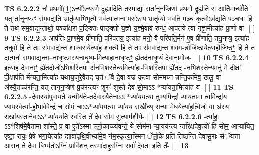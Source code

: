 \documentclass[17pt]{extarticle}
\begin{document}
                  \newline
                                \textbf{ TS 6.2.2.2} \newline
                  नः॑ प्रथ॒मो᳚(1॒)ऽन्यो᳚ऽन्यस्मै॒ द्रुह्या॒दिति॒ तस्मा॒द्यः सता॑नूनप्त्रिणां प्रथ॒मो द्रुह्य॑ति॒ स आर्ति॒मार्च्छ॑ति॒ यत् ता॑नून॒प्त्रꣳ स॑मव॒द्यति॒ भ्रातृ॑व्याभिभूत्यै॒ भव॑त्या॒त्मना॒ परा᳚ऽस्य॒ भ्रातृ॑व्यो भवति॒ पञ्च॒ कृत्वोऽव॑द्यति पञ्च॒धा हि ते तथ् स॑म॒वाद्य॒न्ताथो॒ पञ्चा᳚क्षरा प॒ङ्क्तिः पाङ्क्तो॑ य॒ज्ञो य॒ज्ञ्मे॒वाव॑ रुन्ध॒ आप॑तये त्वा गृह्णा॒मीत्या॑ह प्रा॒णो वा- [  ] \textbf{  9} \newline
                  \newline
                                \textbf{ TS 6.2.2.3} \newline
                  आप॑तिः प्रा॒णमे॒व प्री॑णाति॒ परि॑पतय॒ इत्या॑ह॒ मनो॒ वै परि॑पति॒र्मन॑ ए॒व प्री॑णाति॒ तनू॒नप्त्र॒ इत्या॑ह त॒नुवो॒ हि ते ताः स॑म॒वाद्य॑न्त शाक्व॒रायेत्या॑ह॒ शक्त्यै॒ हि ते ताः स॑म॒वाद्य॑न्त॒ शक्म॒-न्नोजि॑ष्ठा॒येत्या॒हौजि॑ष्ठꣳ॒॒ हि ते त दा॒त्मनः॑ सम॒वाद्य॒न्ता--ना॑धृष्टमस्यनाधृ॒ष्य-मित्या॒हाना॑धृष्टꣳ॒॒ ह्ये॑तद॑नाधृ॒ष्यं दे॒वाना॒मोज॒- [  ] \textbf{  10} \newline
                  \newline
                                \textbf{ TS 6.2.2.4} \newline
                  इत्या॑ह दे॒वानाꣳ॒॒ ह्ये॑तदोजो॑ऽभिशस्ति॒पा अ॑नभिशस्ते॒न्यमित्या॑हा-भिशस्ति॒पा ह्ये॑तद॑ -नभिशस्ते॒न्यमनु॑ मे दी॒क्षां दी॒क्षाप॑ति-र्मन्यता॒मित्या॑ह यथाय॒जुरे॒वैतद्-घृ॒तं ॅवै दे॒वा वज्रं॑ कृ॒त्वा सोम॑मघ्न-न्नन्ति॒कमि॑व॒ खलु॒ वा अ॑स्यै॒तच्च॑रन्ति॒ यत् ता॑नून॒प्त्रेण॑ प्र॒च॑रन्त्यꣳ॒॒ शुरꣳ॑ शुस्ते देव सो॒माऽऽ *प्या॑यता॒मित्या॑ह॒ य- [  ] \textbf{  11} \newline
                  \newline
                                \textbf{ TS 6.2.2.5} \newline
                  -दे॒वास्या॑पुवा॒यते॒ यन्मीय॑ते॒-तदे॒वास्यै॒तेनाऽऽ *प्या॑यय॒त्या तुभ्य॒मिन्द्रः॑ प्यायता॒मा त्वमिन्द्रा॑य प्याय॒स्वेत्या॑-हो॒भावे॒वेन्द्रं॑ च॒ सोमं॒ चाऽऽ*प्या॑यय॒त्या प्या॑यय॒ सखी᳚न्थ् स॒न्या मे॒धयेत्या॑ह॒र्त्विजो॒ वा अ॑स्य॒ सखा॑य॒स्ताने॒वाऽऽ*प्या॑ययति स्व॒स्ति ते॑ देव सोम सु॒त्याम॑शी॒ये- [  ] \textbf{  12} \newline
                  \newline
                                \textbf{ TS 6.2.2.6} \newline
                  -त्या॑हा॒ ऽऽ*शिष॑मे॒वैतामा शा᳚स्ते॒ प्र वा ए॒ते᳚ऽस्मा-ल्लो॒काच्च्य॑वन्ते॒ ये सोम॑मा-प्या॒यय॑न्त्य-न्तरिक्षदेव॒त्यो॑ हि सोम॒ आप्या॑यित॒ एष्टा॒ रायः॒ प्रेषे भगा॒येत्या॑ह॒ द्यावा॑पृथि॒वीभ्या॑मे॒व न॑म॒स्कृत्या॒स्मिन् ॅलो॒के प्रति॑ तिष्ठन्ति देवासु॒राः संॅय॑त्ता आस॒न् ते दे॒वा बिभ्य॑तो॒ऽग्निं प्रावि॑श॒न् तस्मा॑दाहुर॒ग्निः सर्वा॑ दे॒वता॒ इति॒ ते᳚- [  ] \textbf{  13} \newline
\end{document}
